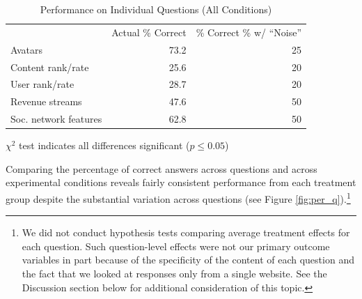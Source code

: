 \documentclass{chi2009}
\begin{document}
\begin{table}[ht]					%
\begin{center}						%
\caption{Performance on Individual Questions (All Conditions)} %
\vspace{8pt}
\begin{threeparttable}
\begin{tabular}{@{}l r r@{}}
\toprule
& Actual \% Correct & \% Correct \% w/ ``Noise'' \\
\cmidrule(l){2-3}
Avatars & 73.2 & 25\\ 
Content rank/rate & 25.6 & 20\\
User rank/rate & 28.7 & 20\\
Revenue streams & 47.6 & 50\\
Soc. network features & 62.8 & 50\\
\bottomrule
\end{tabular}
  \begin{tablenotes}[para]
     \small{\item $\chi^{2}$ test indicates all differences significant ($p \leq 0.05$)}
  \end{tablenotes}
\end{threeparttable}
\label{table:ind_q_results}
\end{center}
\end{table}

Comparing the percentage of correct answers across questions and
across experimental conditions reveals fairly consistent performance
from each treatment group despite the substantial variation
across questions (see Figure \ref{fig:per_q}).\footnote{We did not
  conduct hypothesis tests comparing average treatment effects for
  each question. Such question-level effects were not our primary
  outcome variables in part because of the specificity of the content
  of each question and the fact that we looked at responses only from
  a single website. See the Discussion section below for additional
  consideration of this topic.}
\end{document}
